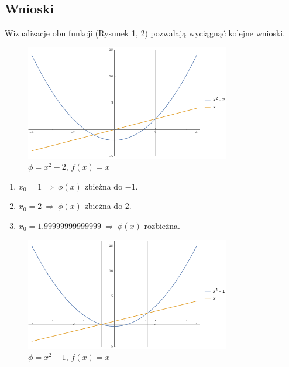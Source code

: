 \documentclass{classrep}
\begin{document}
	\subsection{Wnioski}
		
		Wizualizacje obu funkcji (Rysunek \ref{fig:5}, \ref{fig:6}) pozwalają wyciągnąć kolejne wnioski.
		\begin{figure}[htbp]
			\centering
			\includegraphics[width=0.8\textwidth]{zad6/Myplot1.png}
  			\caption{$\phi=x^2-2$, $f(x)=x$}
  			\label{fig:5}
		\end{figure}	
		
		\begin{enumerate}[1.]
			\item $x_0 = 1 ~\Rightarrow~ \phi(x)$ zbieżna do $-1$.
			\item $x_0 = 2 ~\Rightarrow~ \phi(x)$ zbieżna do $2$.
			\item $x_0 = 1.99999999999999 ~\Rightarrow~ \phi(x)$ rozbieżna.
		\end{enumerate}
		
		\begin{figure}[htbp]
			\centering
			\includegraphics[width=0.8\textwidth]{zad6/Myplot2.png}
  			\caption{$\phi=x^2-1$, $f(x)=x$}
  			\label{fig:6}
		\end{figure}
		
\end{document}
